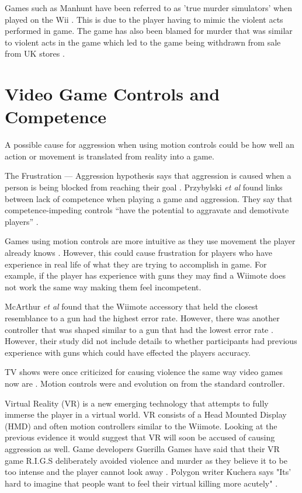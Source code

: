 \documentclass{scrartcl}
\begin{document}
Games such as Manhunt have been referred to as 'true murder simulators' when played on the Wii \cite{Manhunt}. This is due to the player having to mimic the violent acts performed in game.
The game has also been blamed for murder that was similar to violent acts in the game which led to the game being withdrawn from sale from UK stores \cite{Manhunt2Ban, ManhuntMurder}.


\section{Video Game Controls and Competence}
A possible cause for aggression when using motion controls could be how well an action or movement is translated from reality into a game.  

The Frustration --- Aggression hypothesis says that aggression is caused when a person is being blocked from reaching their goal \cite{dollard1939frustration}.  Przybylski \textit{et al} found links between lack of competence when playing a game and aggression. They say that competence-impeding controls ``have the potential to aggravate and demotivate players” \cite{przybylski}.

Games using motion controls are more intuitive as they use movement the player already knows \cite{Kim}. However, this could cause frustration for players who have experience in real life of what they are trying to accomplish in game. For example, if the player has experience with guns they may find a Wiimote does not work the same way making them feel incompetent. 

McArthur \textit{et al}  found that the Wiimote accessory that held the closest resemblance to a gun had the highest error rate. However, there was another controller that was shaped similar to a gun that had the lowest error rate \cite{McArthur}.  However, their study did not include details to whether participants had previous experience with guns which could have effected the players accuracy. 

 
\bigskip

TV shows were once criticized for causing violence the same way video games now are \cite{sherry2001effects}.
Motion controls were and evolution on from the standard controller.

Virtual Reality (VR) is a new emerging technology that attempts to fully immerse the player in a virtual world. VR consists of a Head Mounted Display (HMD) and often motion controllers similar to the Wiimote.
Looking at the previous evidence it would suggest that VR will soon be accused of causing aggression as well. Game developers Guerilla Games have said that their VR game R.I.G.S deliberately avoided violence and murder as they believe it to be too intense and the player cannot look away \cite{VRViolence}.
Polygon writer Kuchera says "Its' hard to imagine that people want to feel their virtual killing more acutely" \cite{PolygonVR} .
\end{document}

